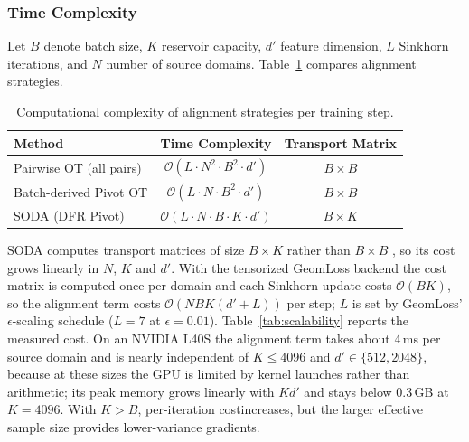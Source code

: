\documentclass[preprint,12pt]{elsarticle}
\providecommand{\DIFadd}[1]{{\protect\color{blue} \sf #1}} %
\providecommand{\DIFdel}[1]{{\protect\color{red} \scriptsize #1}} %
\providecommand{\DIFaddbegin}{} %
\providecommand{\DIFaddend}{} %
\providecommand{\DIFdelbegin}{} %
\providecommand{\DIFdelend}{} %
\newcommand{\DIFscaledelfig}{0.5}
\newlength{\DIFdelgraphicswidth} %
\newlength{\DIFdelgraphicsheight} %
\newcommand{\DIFaddincludegraphics}[2][]{{\color{blue}\fbox{\DIFOincludegraphics[#1]{#2}}}} %
\newcommand{\DIFdelincludegraphics}[2][]{%
\sbox{\DIFdelgraphicsbox}{\DIFOincludegraphics[#1]{#2}}%
\settoboxwidth{\DIFdelgraphicswidth}{\DIFdelgraphicsbox} %
\settoboxtotalheight{\DIFdelgraphicsheight}{\DIFdelgraphicsbox} %
\scalebox{\DIFscaledelfig}{%
\parbox[b]{\DIFdelgraphicswidth}{\usebox{\DIFdelgraphicsbox}\\[-\baselineskip] \rule{\DIFdelgraphicswidth}{0em}}\llap{\resizebox{\DIFdelgraphicswidth}{\DIFdelgraphicsheight}{%
\setlength{\unitlength}{\DIFdelgraphicswidth}%
\begin{picture}(1,1)%
\thicklines\linethickness{2pt} %
{\color[rgb]{1,0,0}\put(0,0){\framebox(1,1){}}}%
{\color[rgb]{1,0,0}\put(0,0){\line( 1,1){1}}}%
{\color[rgb]{1,0,0}\put(0,1){\line(1,-1){1}}}%
\end{picture}%
}\hspace*{3pt}}} %
} %
\DeclareRobustCommand{\DIFaddbegin}{\DIFOaddbegin \let\includegraphics\DIFaddincludegraphics} %
\DeclareRobustCommand{\DIFaddend}{\DIFOaddend \let\includegraphics\DIFOincludegraphics} %
\DeclareRobustCommand{\DIFdelbegin}{\DIFOdelbegin \let\includegraphics\DIFdelincludegraphics} %
\DeclareRobustCommand{\DIFdelend}{\DIFOaddend \let\includegraphics\DIFOincludegraphics} %
\begin{document}
\subsubsection{Time Complexity}

Let $B$ denote batch size, $K$ reservoir capacity, $d'$ feature dimension, $L$ Sinkhorn iterations, and $N$ number of source domains. Table~\ref{tab:complexity} compares alignment strategies.

\begin{table}[t]
\caption{Computational complexity of alignment strategies per training step.}
\label{tab:complexity}
\centering
\small
\begin{tabular}{lcc}
\toprule
\textbf{Method} & \textbf{Time Complexity} & \textbf{Transport Matrix} \\
\midrule
Pairwise OT (all pairs) & $\mathcal{O}(L \cdot N^2 \cdot B^2 \cdot d')$ & $B \times B$ \\
Batch-derived Pivot OT & $\mathcal{O}(L \cdot N \cdot B^2 \cdot d')$ & $B \times B$ \\
SODA (DFR Pivot) & $\mathcal{O}(L \cdot N \cdot B \cdot K \cdot d')$ & $B \times K$ \\
\bottomrule
\end{tabular}
\end{table}

SODA computes transport matrices of size $B \times K$ rather than $B \times B$\DIFaddbegin \DIFadd{, so its cost grows linearly in $N$, $K$ and $d'$. With the tensorized GeomLoss backend the cost matrix is computed once per domain and each Sinkhorn update costs $\mathcal O(BK)$, so the alignment term costs $\mathcal O(NBK(d'+L))$ per step; $L$ is set by GeomLoss' $\epsilon$-scaling schedule ($L=7$ at $\epsilon=0.01$). Table~\ref{tab:scalability} reports the measured cost. On an NVIDIA L40S the alignment term takes about 4\,ms per source domain and is nearly independent of $K\le4096$ and $d'\in\{512,2048\}$, because at these sizes the GPU is limited by kernel launches rather than arithmetic; its peak memory grows linearly with $K d'$ and stays below 0.3\,GB at $K=4096$}\DIFaddend .
\DIFdelbegin \DIFdel{With $K > B$, per-iteration costincreases, but the larger effective sample size provides lower-variance gradients.
}\DIFdelend 
\end{document}
